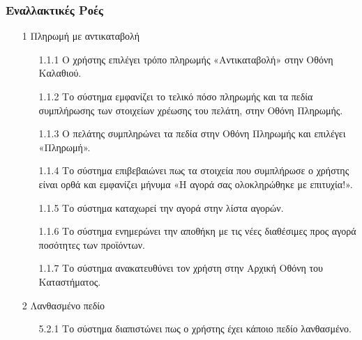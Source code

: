 \documentclass[12pt,a4paper,twoside]{book}
\begin{document}
\subsubsection{Εναλλακτικές Ροές}
\begin{enumerate}
  \item[1 ] Πληρωμή με αντικαταβολή  %
        \begin{enumerate}
          \item[1.1.1 ] Ο χρήστης επιλέγει τρόπο πληρωμής «Αντικαταβολή» στην Οθόνη Καλαθιού. %
          \item[1.1.2 ] Το σύστημα εμφανίζει το τελικό πόσο πληρωμής και τα πεδία συμπλήρωσης των στοιχείων χρέωσης του πελάτη, στην Οθόνη Πληρωμής. %
          \item[1.1.3 ] Ο πελάτης συμπληρώνει τα πεδία στην Οθόνη Πληρωμής και επιλέγει «Πληρωμή». %
          \item[1.1.4 ] Το σύστημα επιβεβαιώνει πως τα στοιχεία που συμπλήρωσε ο χρήστης είναι ορθά και εμφανίζει μήνυμα «Η αγορά σας ολοκληρώθηκε με επιτυχία!». %
          \item[1.1.5 ] Το σύστημα καταχωρεί την αγορά στην λίστα αγορών. %
          \item[1.1.6 ] Το σύστημα ενημερώνει την αποθήκη με τις νέες διαθέσιμες προς αγορά ποσότητες των προϊόντων. %
          \item[1.1.7 ] Το σύστημα ανακατευθύνει τον χρήστη στην Αρχική Οθόνη του Καταστήματος. %
        \end{enumerate}
  \item[2 ] Λανθασμένο πεδίο %
        \begin{enumerate}
          \item[5.2.1 ] Το σύστημα διαπιστώνει πως ο χρήστης έχει κάποιο πεδίο λανθασμένο. %

\end{enumerate}
\end{enumerate}
\end{document}
